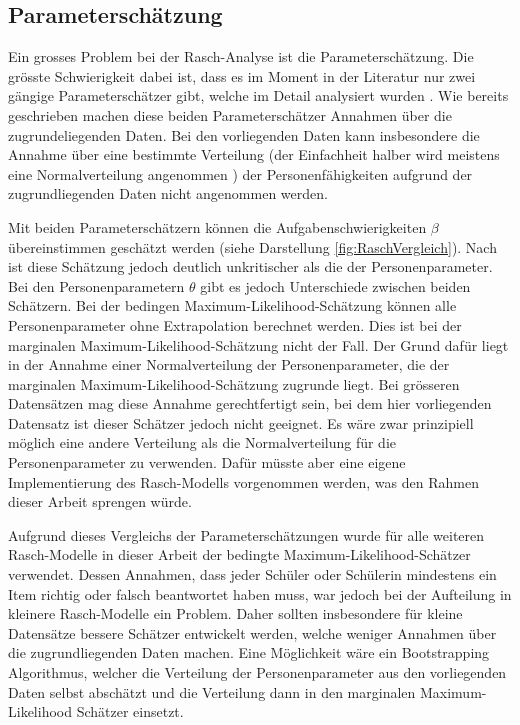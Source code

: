 \subsection{Parameterschätzung}

Ein grosses Problem bei der Rasch-Analyse ist die Parameterschätzung. Die grösste Schwierigkeit dabei ist, dass es im Moment in der Literatur nur zwei gängige Parameterschätzer gibt, welche im Detail analysiert wurden \citep{Fischer1995,Rost2004, Strobl2012}. Wie bereits geschrieben machen diese beiden Parameterschätzer Annahmen über die zugrundeliegenden Daten. Bei den vorliegenden Daten kann insbesondere die Annahme über eine bestimmte Verteilung (der Einfachheit halber wird meistens eine Normalverteilung angenommen \citep{Rost2004}) der Personenfähigkeiten aufgrund der zugrundliegenden Daten nicht angenommen werden.

Mit beiden Parameterschätzern können die Aufgabenschwierigkeiten $\beta$ übereinstimmen geschätzt werden (siehe Darstellung \ref{fig:RaschVergleich}). Nach \citet{Rost2004} ist diese Schätzung jedoch deutlich unkritischer als die der Personenparameter. Bei den Personenparametern $\theta$ gibt es jedoch Unterschiede zwischen beiden Schätzern. Bei der bedingen Maximum-Likelihood-Schätzung können alle Personenparameter ohne Extrapolation berechnet werden. Dies ist bei der marginalen Maximum-Likelihood-Schätzung nicht der Fall. Der Grund dafür liegt in der Annahme einer Normalverteilung der Personenparameter, die der marginalen Maximum-Likelihood-Schätzung zugrunde liegt. Bei grösseren Datensätzen mag diese Annahme gerechtfertigt sein, bei dem hier vorliegenden Datensatz ist dieser Schätzer jedoch nicht geeignet. Es wäre zwar prinzipiell möglich eine andere Verteilung als die Normalverteilung für die Personenparameter zu verwenden. Dafür müsste aber eine eigene Implementierung des Rasch-Modells vorgenommen werden, was den Rahmen dieser Arbeit sprengen würde.

Aufgrund dieses Vergleichs der Parameterschätzungen wurde für alle weiteren Rasch-Modelle in dieser Arbeit der bedingte Maximum-Likelihood-Schätzer verwendet. Dessen Annahmen, dass jeder Schüler oder Schülerin mindestens ein Item richtig oder falsch beantwortet haben muss, war jedoch bei der Aufteilung in kleinere Rasch-Modelle ein Problem. Daher sollten insbesondere für kleine Datensätze bessere Schätzer entwickelt werden, welche weniger Annahmen über die zugrundliegenden Daten machen. Eine Möglichkeit wäre ein Bootstrapping Algorithmus, welcher die Verteilung der Personenparameter aus den vorliegenden Daten selbst abschätzt und die Verteilung dann in den marginalen Maximum-Likelihood Schätzer einsetzt.

